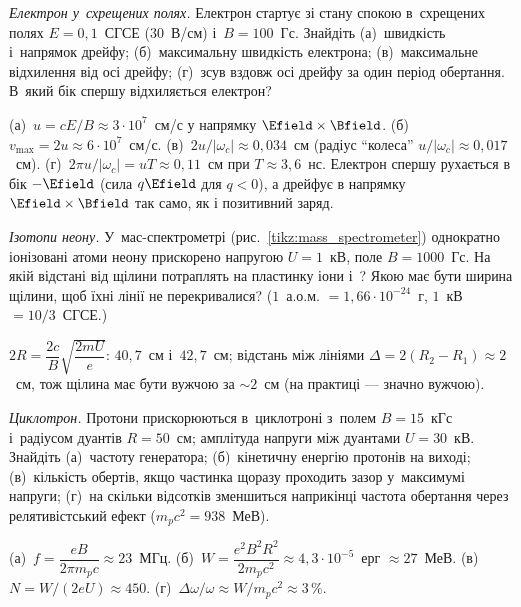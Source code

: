 \begin{problem}\label{prb:CycloidElectron}
	\emph{Електрон у~схрещених полях.} Електрон стартує зі стану спокою в~схрещених полях $E = 0{,}1$~СГСЕ ($30$~В/см) і~$B = 100$~Гс. Знайдіть (а)~швидкість і~напрямок дрейфу; (б)~максимальну швидкість електрона; (в)~максимальне відхилення від осі дрейфу; (г)~зсув вздовж осі дрейфу за один період обертання. В~який бік спершу відхиляється електрон?
	\begin{solution}
		(а)~$u = cE/B \approx 3\cdot10^{7}$~см/с у напрямку $\Efield \times \Bfield$. (б)~$v_{\max} = 2u \approx 6\cdot10^{7}$~см/с. (в)~$2u/|\omega_c| \approx 0{,}034$~см (радіус \enquote{колеса} $u/|\omega_c| \approx 0{,}017$~см). (г)~$2\pi u/|\omega_c| = uT \approx 0{,}11$~см при $T \approx 3{,}6$~нс. Електрон спершу рухається в бік $-\Efield$ (сила $q\Efield$ для $q<0$), а дрейфує в напрямку $\Efield \times \Bfield$ так само, як і позитивний заряд.
	\end{solution}
\end{problem}

\begin{problem}\label{prb:MassSpectrometerNeon}
	\emph{Ізотопи неону.} У~мас-спектрометрі (рис.~\ref{tikz:mass_spectrometer}) однократно іонізовані атоми неону прискорено напругою
	$U = 1$~кВ, поле $B = 1000$~Гс. На якій відстані від щілини потраплять на пластинку іони  і~? Якою має бути
	ширина щілини, щоб їхні лінії не перекривалися? ($1$~а.о.м. $= 1{,}66\cdot10^{-24}$~г, $1$~кВ $= 10/3$~СГСЕ.)
	\begin{solution}
		$2R = \dfrac{2c}{B}\sqrt{\dfrac{2mU}{e}}$: $40{,}7$~см і~$42{,}7$~см; відстань між лініями $\Delta = 2(R_2-R_1) \approx 2$~см, тож щілина має бути вужчою за $\sim 2$~см (на практиці --- значно вужчою).
	\end{solution}
\end{problem}

\begin{problem}\label{prb:CyclotronProtons}
	\emph{Циклотрон.} Протони прискорюються в~циклотроні з~полем $B = 15$~кГс і~радіусом дуантів $R = 50$~см; амплітуда напруги між
	дуантами $U = 30$~кВ. Знайдіть (а)~частоту генератора; (б)~кінетичну енергію протонів на виході; (в)~кількість обертів, якщо частинка
	щоразу проходить зазор у~максимумі напруги; (г)~на скільки відсотків зменшиться наприкінці частота обертання через релятивістський
	ефект ($m_pc^2 = 938$~МеВ).
	\begin{solution}
		(а)~$f = \dfrac{eB}{2\pi m_pc} \approx 23$~МГц. (б)~$W = \dfrac{e^2B^2R^2}{2m_pc^2} \approx 4{,}3\cdot10^{-5}$~ерг $\approx 27$~МеВ. (в)~$N = W/(2eU) \approx 450$. (г)~$\Delta\omega/\omega \approx W/m_pc^2 \approx 3\,\%$.
	\end{solution}
\end{problem}

